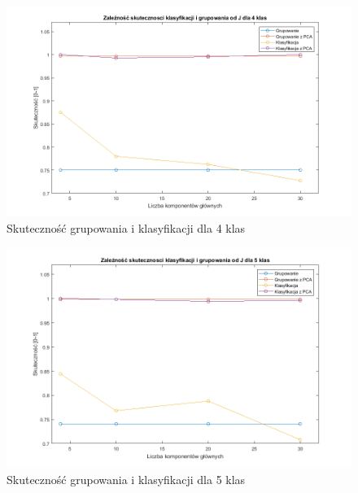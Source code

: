 \begin{figure}[H]
	\centering
	\hspace*{-0.8in}
	\includegraphics[scale = 0.7]{img/acc_from_J_4classes.png}
	\caption{Skuteczność grupowania i klasyfikacji dla 4 klas}  
	\label{rys:acc_from_J_42classes} 
\end{figure}

\begin{figure}[H]
	\centering
	\hspace*{-0.8in}
	\includegraphics[scale = 0.7]{img/acc_from_J_5classes.png}
	\caption{Skuteczność grupowania i klasyfikacji dla 5 klas}  
	\label{rys:acc_from_J_5classes} 
\end{figure}